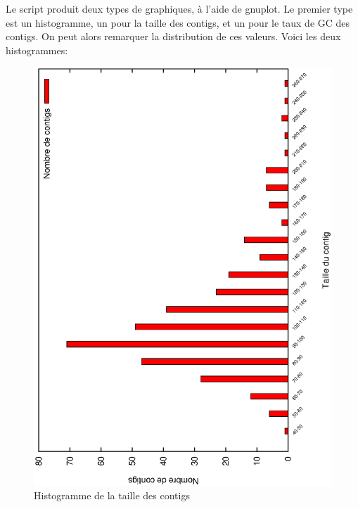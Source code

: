 \documentclass[10.9pt]{article} %
\begin{document}
Le script produit deux types de graphiques, à l'aide de gnuplot. Le premier type est un
histogramme, un pour la taille des contigs, et un pour le taux de GC des contigs. On peut
alors remarquer la distribution de ces valeurs. Voici les deux histogrammes:
\begin{figure}[p]
\centering
\includegraphics[scale=0.6,angle=270]{question_1/histogramme_taille.eps}
\caption{Histogramme de la taille des contigs}

\end{figure}
\end{document}
